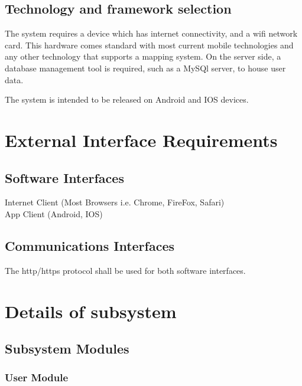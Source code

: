 \documentclass{article}
\begin{document}
		\subsection{Technology and framework selection}
		The system requires a device which has internet connectivity, and a wifi network card. This hardware comes standard with most current mobile technologies and any other technology that supports a mapping system. On the server side, a database management tool is required, such as a MySQl server, to house user data.
		
		The system is intended to be released on Android and IOS devices.
		
		
	\section{External Interface Requirements}
		\subsection{Software Interfaces}
		Internet Client (Most Browsers i.e. Chrome, FireFox, Safari) \\
		App Client (Android, IOS)
		\subsection{Communications Interfaces}
		The http/https protocol shall be used for both software interfaces.
			
	\section{Details of subsystem}
	\subsection{Subsystem Modules}
		\subsubsection{User Module}
\end{document}
